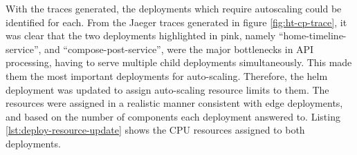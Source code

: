 With the traces generated, the deployments which require autoscaling could be identified for each. From the Jaeger traces generated in figure \ref{fig:ht-cp-trace}, it was clear that the two deployments highlighted in pink, namely ``home-timeline-service'', and ``compose-post-service'', were the major bottlenecks in API processing, having to serve multiple child deployments simultaneously. This made them the most important deployments for auto-scaling. Therefore, the helm deployment was updated to assign auto-scaling resource limits to them. The resources were assigned in a realistic manner consistent with edge deployments, and based on the number of components each deployment answered to. Listing \ref{lst:deploy-resource-update} shows the CPU resources assigned to both deployments.\par

